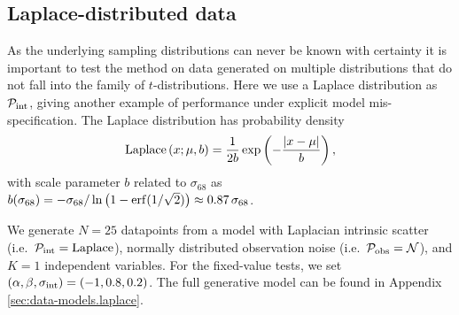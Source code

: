 \documentclass[fleqn,usenatbib]{rasti}
\begin{document}

\subsection{Laplace-distributed data}
\label{sec:results.laplace}

As the underlying sampling distributions can never be known with certainty it is
important to test the method on data generated on multiple distributions that do
not fall into the family of $t$-distributions. Here we use a Laplace
distribution as $\mathcal P_{\rm int}$, giving another example of performance
under explicit model mis-specification. The Laplace distribution has probability
density
\begin{equation}
    {\rm Laplace}\left(x; \mu, b\right) = \frac1{2b} \exp\left(-\frac{\left|x - \mu\right|}{b}\right),
\end{equation}
with scale parameter $b$ related to $\sigma_{68}$ as $b(\sigma_{68}) =
- \sigma_{68} / \ln \left( 1 - {\rm erf} (1/{\sqrt{2}})\right) \approx 0.87\,
\sigma_{68}$.

We generate $N = 25$ datapoints from a model with Laplacian intrinsic scatter
(i.e.\ $\mathcal P_{\rm int} = \mathrm{Laplace}$), normally distributed
observation noise (i.e.\ $\mathcal P_{\rm obs} = \mathcal N$), and $K = 1$
independent variables. For the fixed-value tests, we set $(\alpha, \beta,
\sigma_{\rm int}) = (-1, 0.8, 0.2)$. The full generative model can be found in
Appendix \ref{sec:data-models.laplace}.
\end{document}
